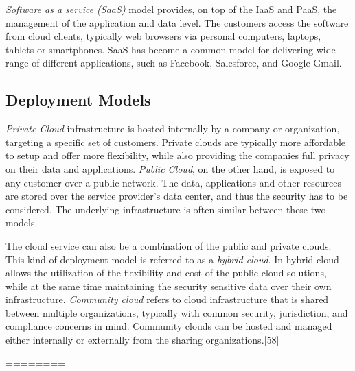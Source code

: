 \emph{Software as a service (SaaS)} model provides, on top of the IaaS and PaaS, the management of the application and data level. The customers access the software from cloud clients, typically web browsers via personal computers, laptops, tablets or smartphones. SaaS has become a common model for delivering wide range of different applications, such as Facebook, Salesforce, and Google Gmail.

\subsection{Deployment Models}
\emph{Private Cloud} infrastructure is hosted internally by a company or organization, targeting a specific set of customers. Private clouds are typically more affordable to setup and offer more flexibility, while also providing the companies full privacy on their data and applications. \emph{Public Cloud}, on the other hand, is exposed to any customer over a public network. The data, applications and other resources are stored over the service provider's data center, and thus the security has to be considered. The underlying infrastructure is often similar between these two models.

The cloud service can also be a combination of the public and private clouds. This kind of deployment model is referred to as a \emph{hybrid cloud}. In hybrid cloud allows the utilization of the flexibility and cost of the public cloud solutions, while at the same time maintaining the security sensitive data over their own infrastructure. \emph{Community cloud} refers to cloud infrastructure that is shared between multiple organizations, typically with common security, jurisdiction, and compliance concerns in mind. Community clouds can be hosted and managed either internally or externally from the sharing organizations.[58]

========




